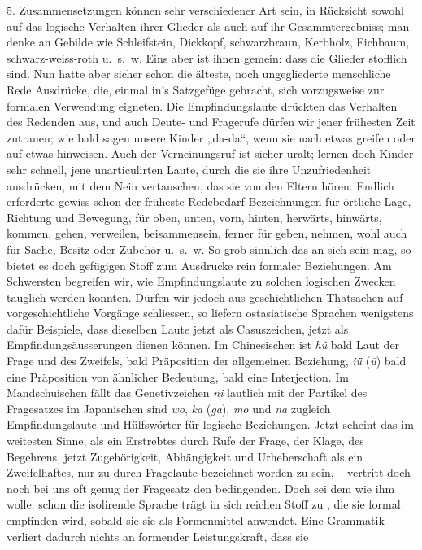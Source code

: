 \label{IV.III.II.4.5}5. Zusammensetzungen können sehr verschiedener Art sein, in Rücksicht sowohl auf das logische Verhalten ihrer Glieder  als \label{fp.329} auch auf ihr Gesammtergebniss; man denke an Gebilde wie Schleifstein, Dickkopf, schwarz\-\label{sp.347}braun, Kerbholz, Eichbaum, schwarz-weiss-roth u.~s.~w. Eins aber ist ihnen gemein: dass die Glieder  stofflich sind. Nun hatte aber sicher schon die älteste, noch ungegliederte menschliche Rede Ausdrücke, die, einmal in’s Satzgefüge gebracht, sich vorzugsweise zur formalen Verwendung eigneten. Die Empfindungslaute drückten das  Verhalten des Redenden aus, und auch Deute- und Fragerufe dürfen wir jener frühesten Zeit zutrauen; wie bald sagen unsere Kinder „da-da“, wenn sie nach etwas greifen oder auf etwas hinweisen. Auch der Verneinungsruf ist sicher uralt; lernen doch Kinder sehr schnell, jene unarticulirten Laute, durch die sie ihre Unzufriedenheit ausdrücken, mit dem Nein vertauschen, das sie von den Eltern hören. Endlich erforderte gewiss schon der früheste Redebedarf Bezeichnungen für örtliche Lage, Richtung und Bewegung, für oben, unten, vorn, hinten, herwärts, hinwärts, kommen, gehen, verweilen, beisammensein, ferner für geben, nehmen, wohl auch für Sache, Besitz oder Zubehör u.~s.~w. So grob sinnlich das an sich sein mag, so bietet es doch gefügigen Stoff zum Ausdrucke \label{fp.198} rein formaler Beziehungen. Am Schwersten begreifen wir, wie Empfindungslaute zu solchen logischen Zwecken tauglich werden konnten. Dürfen wir jedoch aus geschichtlichen Thatsachen auf vorgeschichtliche Vorgänge schliessen, so liefern ostasiatische Sprachen wenigstens dafür Beispiele, dass dieselben Laute jetzt als Casuszeichen, jetzt als Empfindungsäusserungen dienen können. Im Chinesischen ist \textit{hû} bald Laut der Frage und des Zweifels, bald Präposition der allgemeinen Beziehung, \textit{iǖ} (\textit{ū}) bald eine Präposition von ähnlicher Bedeutung, bald eine Interjection. Im Mandschuischen fällt das Genetivzeichen \textit{ni} lautlich mit der Partikel des Fragesatzes  im Japanischen sind \textit{wo}, \textit{ka} (\textit{ga}), \textit{mo} und \textit{na} zugleich Empfindungslaute und Hülfswörter für logische Beziehungen. Jetzt scheint das  im weitesten Sinne, als ein Erstrebtes durch Rufe der Frage, der Klage, des Begehrens,  jetzt Zugehörigkeit, Abhängigkeit und Urheberschaft als ein Zweifelhaftes, nur zu  durch Fragelaute bezeichnet worden zu sein, – vertritt doch noch bei uns oft genug der Fragesatz den bedingenden. Doch sei dem wie ihm wolle: schon die isolirende Sprache trägt in sich reichen Stoff zu , die sie formal empfinden wird, sobald sie sie als Formenmittel anwendet. Eine Grammatik verliert dadurch nichts an formender Leistungskraft, dass sie \label{fp.330} 